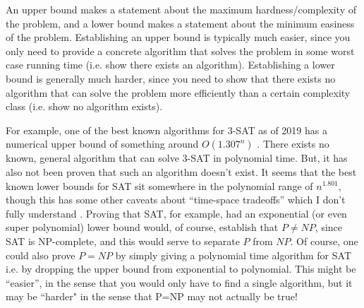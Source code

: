\documentclass[10pt,a4paper]{article}
\begin{document}
An upper bound makes a statement about the maximum hardness/complexity of the problem, and a lower bound makes a statement about the minimum easiness of the problem. Establishing an upper bound is typically much easier, since you only need to provide a concrete algorithm that solves the problem in some worst case running time (i.e. show there exists an algorithm). Establishing a lower bound is generally much harder, since you need to show that there exists no algorithm that can solve the problem more efficiently than a certain complexity class (i.e. show no algorithm exists). 

For example, one of the best known algorithms for 3-SAT as of 2019 has a numerical upper bound of something around $O(1.307^n)$ \cite{2019fasterkSAT}. There exists no known, general algorithm that can solve 3-SAT in polynomial time. But, it has also not been proven that such an algorithm doesn't exist. It seems that the best known lower bounds for SAT sit somewhere in the polynomial range of $n^{1.801}$, though this has some other caveats about ``time-space tradeoffs'' which I don't fully understand \cite{SE3satlowerbounds}. Proving that SAT, for example, had an exponential (or even super polynomial) lower bound would, of course, establish that $P \neq NP$, since SAT is NP-complete, and this would serve to separate $P$ from $NP$. Of course, one could also prove $P=NP$ by simply giving a polynomial time algorithm for SAT i.e. by dropping the upper bound from exponential to polynomial. This might be ``easier'', in the sense that you would only have to find a single algorithm, but it may be ``harder" in the sense that P=NP may not actually be true!







\end{document}

